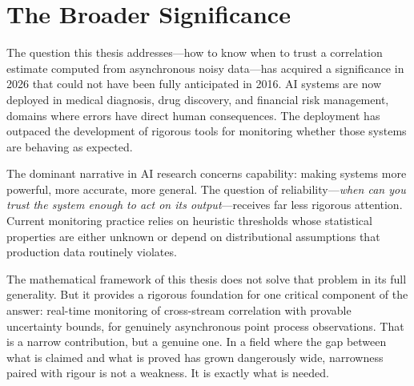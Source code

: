 \documentclass[reqno, 12pt]{amsart}
\theoremstyle{plain}
\theoremstyle{definition}
\theoremstyle{remark}
\begin{document}
\section{The Broader Significance}
\label{sec:significance}

The question this thesis addresses---how to know when to trust a
correlation estimate computed from asynchronous noisy data---has
acquired a significance in 2026 that could not have been fully
anticipated in 2016. AI systems are now deployed in medical diagnosis,
drug discovery, and financial risk management, domains where errors
have direct human consequences. The deployment has outpaced the
development of rigorous tools for monitoring whether those systems are
behaving as expected.

The dominant narrative in AI research concerns capability: making
systems more powerful, more accurate, more general. The question of
reliability---\emph{when can you trust the system enough to act on its
output}---receives far less rigorous attention. Current monitoring
practice relies on heuristic thresholds whose statistical properties
are either unknown or depend on distributional assumptions that
production data routinely violates.

The mathematical framework of this thesis does not solve that problem
in its full generality. But it provides a rigorous foundation for one
critical component of the answer: real-time monitoring of cross-stream
correlation with provable uncertainty bounds, for genuinely asynchronous
point process observations. That is a narrow contribution, but a
genuine one. In a field where the gap between what is claimed and what
is proved has grown dangerously wide, narrowness paired with rigour is
not a weakness. It is exactly what is needed.
\end{document}
